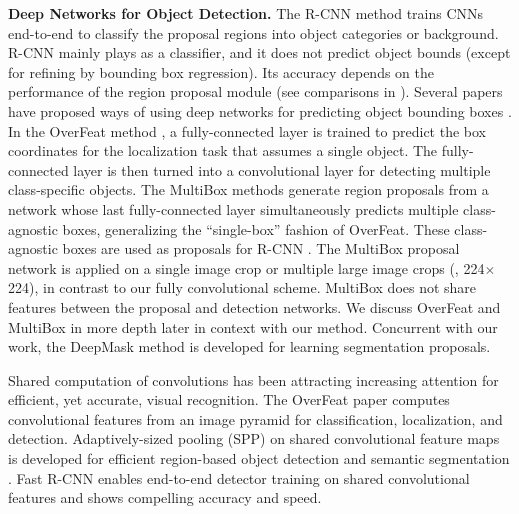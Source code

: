 \documentclass[10pt,journal,cspaper,compsoc]{IEEEtran}
\begin{document}
\vspace{.5em}
\noindent\textbf{Deep Networks for Object Detection.} The R-CNN method \cite{Girshick2014} trains CNNs end-to-end to classify the proposal regions into object categories or background. R-CNN mainly plays as a classifier, and it does not  predict object bounds (except for refining by bounding box regression).
Its accuracy depends on the performance of the region proposal module (see comparisons in \cite{Hosang2015}).
Several papers have proposed ways of using deep networks for predicting object bounding boxes \cite{Szegedy2013,Sermanet2014,Erhan2014,Szegedy2014a}.
In the OverFeat method \cite{Sermanet2014}, a fully-connected layer is trained to predict the box coordinates for the localization task that assumes a single object. The fully-connected layer is then turned into a convolutional layer for detecting multiple class-specific objects. The MultiBox methods \cite{Erhan2014,Szegedy2014a} generate region proposals from a network whose last fully-connected layer simultaneously predicts multiple class-agnostic boxes, generalizing the ``single-box'' fashion of OverFeat. These class-agnostic boxes are used as proposals for R-CNN \cite{Girshick2014}.
The MultiBox proposal network is applied on a single image crop or multiple large image crops (\eg, 224$\times$224), in contrast to our fully convolutional scheme. MultiBox does not share features between the proposal and detection networks.
We discuss OverFeat and MultiBox in more depth later in context with our method.
Concurrent with our work, the DeepMask method \cite{Pinheiro2015} is developed for learning segmentation proposals.

Shared computation of convolutions \cite{Sermanet2014,He2014,Dai2015,Long2015,Girshick2015a} has been attracting increasing attention for efficient, yet accurate, visual recognition. The OverFeat paper \cite{Sermanet2014} computes convolutional features from an image pyramid for classification, localization, and detection. Adaptively-sized pooling (SPP) \cite{He2014} on shared convolutional feature maps is developed for efficient region-based object detection \cite{He2014,Ren2015} and semantic segmentation \cite{Dai2015}. Fast R-CNN \cite{Girshick2015a} enables end-to-end detector training on shared convolutional features and shows compelling accuracy and speed.
\end{document}
